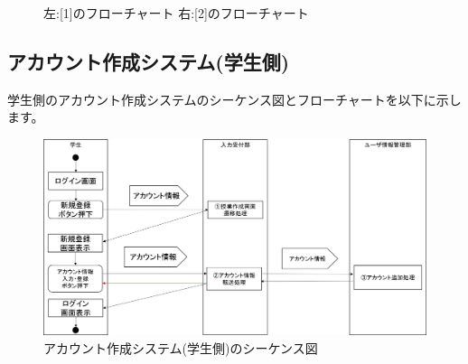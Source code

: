 \begin{figure}[htbp]
\begin{minipage}{0.5\hsize}
\begin{center}
  \end{center}
 \end{minipage}
 \caption{左:[1]のフローチャート 右:[2]のフローチャート}\label{fig:adminloginflow0}
\end{figure}

\newpage
\subsection{アカウント作成システム(学生側)}
学生側のアカウント作成システムのシーケンス図とフローチャートを以下に示します。

\begin{figure}[htbp]
  \begin{center}
    \includegraphics[width=1\linewidth,clip]{./img/create_account/main.png}
    \caption{アカウント作成システム(学生側)のシーケンス図}\label{fig:createseaquence}
  \end{center}
\end{figure}

